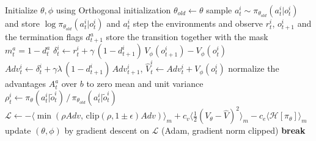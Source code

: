 \begin{algorithm}[t]
\caption{IPPO}
\label{alg:ippo}
\begin{algorithmic}[1]
\State Initialize $\theta,\phi$ using Orthogonal initialization
    \State $\theta_{old} \gets \theta$ 
     
            \State sample $a^i_t \sim \pi_{\theta_{old}}(a^i_t|o^i_t)$ and store $\log\pi_{\theta_{old}}(a^i_t|o^i_t)$ and $a^i_t$
        \EndFor
        \State step the environments and observe $r^i_t$, $o^i_{t+1}$ and the termination flags $d^a_{t+1}$
        \State store the transition together with the mask $m^a_t = 1 - d^a_t$
    \EndFor
     
         
            \State $\delta^i_t \gets r^i_t + \gamma\,(1-d^i_{t+1})\,V_{\phi}(o^i_{t+1}) - V_{\phi}(o^i_t)$
            \State $Adv^i_t \gets \delta^i_t + \gamma\lambda\,(1-d^i_{t+1})\,Adv^i_{t+1}$, \quad $\hat{V}^i_t \gets Adv^i_t + V_{\phi}(o^i_t)$
        \EndFor
         
            \State normalize the advantages $A^a_t$ over $b$ to zero mean and unit variance
            \State $\rho^i_t \gets \pi_\theta(a^i_t|\tilde{o}^i_t) \,/\, \pi_{\theta_{old}}(a^i_t|\tilde{o}^i_t)$
            \State $\mathcal{L} \gets
                    -\langle \min(\rho Adv,\, \mathrm{clip}(\rho,1\!\pm\!\epsilon)Adv)\rangle_m
                    + c_v \langle \tfrac{1}{2}(V_\theta - \hat{V})^2 \rangle_m
                    - c_e \langle \mathcal{H}[\pi_\theta] \rangle_m$
            \State update $(\theta,\phi)$ by gradient descent on $\mathcal{L}$
                    (Adam, gradient norm clipped)
        \EndFor
            \State \textbf{break} 
        \EndIf
    \EndFor
\EndWhile
\end{algorithmic}
\end{algorithm}

